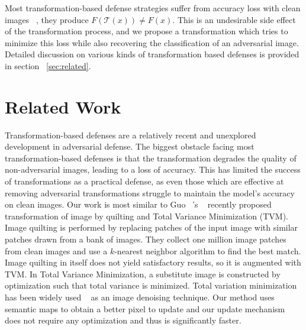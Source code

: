 Most transformation-based defense strategies suffer from accuracy loss with clean images  ~\cite{Dziugaite2016ASO,Kurakin2016AdversarialEI}, \ie they produce $F(\mathcal{T}(x)) \neq F(x)$.
This is an undesirable side effect of the transformation process, and we propose a transformation which tries to minimize this loss while also recovering the classification of an adversarial image. 
Detailed discussion on various kinds of transformation based defenses is provided in section ~\ref{sec:related}.

\section{Related Work \label{sec:related}}

Transformation-based defenses are a relatively recent and unexplored development in adversarial defense. 
The biggest obstacle facing most transformation-based defenses is that the transformation degrades the quality of non-adversarial images, leading to a loss of accuracy.
This has limited the success of transformations as a practical defense, as even those which are effective at removing adversarial transformations struggle to maintain the model's accuracy on clean images.
Our work is most similar to Guo ~\etal's ~\cite{CounteringAIGuo17} recently proposed transformation of image by quilting and Total Variance Minimization (TVM). 
Image quilting is performed by replacing patches of the input image with similar patches drawn from a bank of images.
They collect one million image patches from clean images and use a $k$-nearest neighbor algorithm to find the best match.
Image quilting in itself does not yield satisfactory results, so it is augmented with TVM.
In Total Variance Minimization, a substitute image is constructed by optimization such that total variance is minimized.
Total variation minimization has been widely used ~\cite{Getreuer2012RudinOsherFatemiTV} as an image denoising technique. 
Our method uses semantic maps to obtain a better pixel to update and our update mechanism does not require any optimization and thus is significantly faster.

